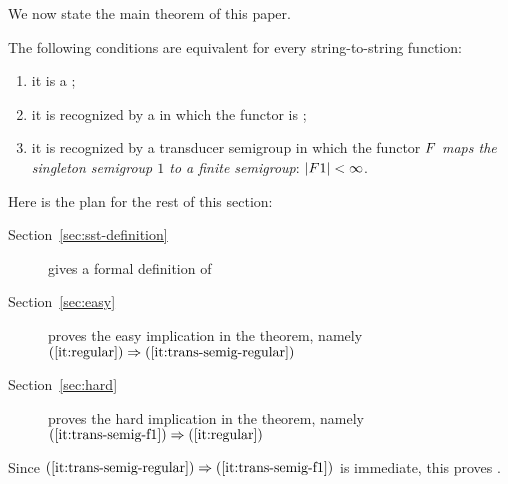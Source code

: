 We now state the main theorem of this paper. 

\begin{theorem}\label{thm:regular-functions}
    The following conditions are equivalent for every string-to-string function:
    \begin{enumerate}
        \item \label{it:regular} it is a ;
        \item \label{it:trans-semig-regular}it is recognized by a   in which the functor is ;
        \item \label{it:trans-semig-f1}it is recognized by a transducer
            semigroup in which the functor $\functor$ \emph{maps the singleton
          semigroup $1$ to a finite semigroup}: $|\functor1|<\infty$.
    \end{enumerate}
\end{theorem}

\noindent Here is the plan for the rest of this section:
\begin{description}
    \item[Section~\ref{sec:sst-definition}] gives a formal definition of 
    \item[Section~\ref{sec:easy}] proves the easy  implication in the theorem, namely  $(\ref{it:regular}) \Rightarrow (\ref{it:trans-semig-regular})$
    \item[Section~\ref{sec:hard}] proves the hard  implication in the theorem, namely  $(\ref{it:trans-semig-f1}) \Rightarrow (\ref{it:regular})$
\end{description}
Since $(\ref{it:trans-semig-regular}) \Rightarrow (\ref{it:trans-semig-f1})$ is
immediate, this proves .

